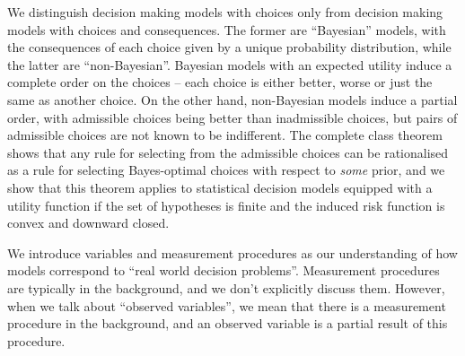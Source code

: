 We distinguish decision making models with choices only from decision making models with choices and consequences. The former are ``Bayesian'' models, with the consequences of each choice given by a unique probability distribution, while the latter are ``non-Bayesian''. Bayesian models with an expected utility induce a complete order on the choices -- each choice is either better, worse or just the same as another choice. On the other hand, non-Bayesian models induce a partial order, with admissible choices being better than inadmissible choices, but pairs of admissible choices are not known to be indifferent. The complete class theorem shows that any rule for selecting from the admissible choices can be rationalised as a rule for selecting Bayes-optimal choices with respect to \emph{some} prior, and we show that this theorem applies to statistical decision models equipped with a utility function if the set of hypotheses is finite and the induced risk function is convex and downward closed.

We introduce variables and measurement procedures as our understanding of how models correspond to ``real world decision problems''. Measurement procedures are typically in the background, and we don't explicitly discuss them. However, when we talk about ``observed variables'', we mean that there is a measurement procedure in the background, and an observed variable is a partial result of this procedure.